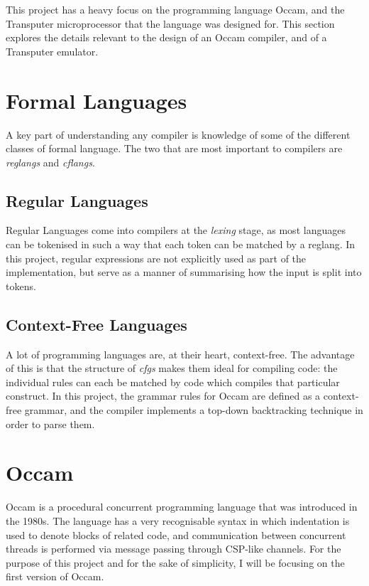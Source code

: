 This project has a heavy focus on the programming language Occam, and the
Transputer microprocessor that the language was designed for. This section
explores the details relevant to the design of an Occam compiler, and of a
Transputer emulator.

\section{Formal Languages}

A key part of understanding any compiler is knowledge of some of the different
classes of formal language. The two that are most important to compilers are
\textit{\gls{reglang}s} and \textit{\gls{cflang}s}.

\subsection{Regular Languages}

Regular Languages come into compilers at the \textit{\gls{lexing}} stage, as most
languages can be tokenised in such a way that each token can be matched by a
\gls{reglang}. In this project, regular expressions are not explicitly used as
part of the implementation, but serve as a manner of summarising how the input
is split into tokens.

\subsection{Context-Free Languages}

A lot of programming languages are, at their heart, context-free. The advantage
of this is that the structure of \textit{\gls{cfg}s} makes them ideal for
compiling code: the individual rules can each be matched by code which compiles
that particular construct. In this project, the grammar rules for Occam are
defined as a context-free grammar, and the compiler implements a top-down
backtracking technique in order to parse them.

\section{Occam}

Occam is a procedural concurrent programming language that was introduced in the
1980s. The language has a very recognisable syntax in which indentation is used
to denote blocks of related code, and communication between concurrent threads
is performed via message passing through CSP-like channels. For the purpose of
this project and for the sake of simplicity, I will be focusing on the first
version of Occam.

